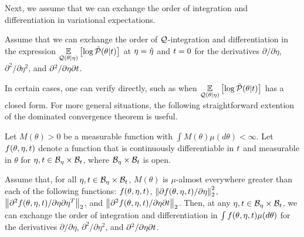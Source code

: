 Next, we assume that we can exchange the order of integration and
differentiation in variational expectations.

%
\begin{assu}
%
Assume that we can exchange the order of $\mathcal{Q}$-integration and differentiation in
the expression $\underset{\mathcal{Q}(\theta \vert \eta)}{\mathbb{E}}\left[\log \tilde{\mathcal{P}}(\theta \vert t)\right]$ at
$\eta = \hat\eta$ and $t = 0$ for the derivatives $\partial / \partial \eta$,
$\partial^2 / \partial \eta^2$, and $\partial^2 / \partial \eta \partial t$.
%
\end{assu}

In certain cases, one can verify  directly, such as when
$\underset{\mathcal{Q}(\theta \vert \eta)}{\mathbb{E}}\left[\log \tilde{\mathcal{P}}(\theta \vert t)\right]$ has a closed form.
For more general situations, the following straightforward extention of the
dominated convergence theorem \citep[Theorem 16.8]{billingsley:1986:probability}
is useful.

%
\begin{lem}
%
Let $M(\theta) > 0$ be a measurable function with $\int M(\theta) \mu(d\theta) <
\infty$.  Let $f(\theta, \eta, t)$ denote a function that is continuously
differentiable in $t$ and measurable in $\theta$ for $\eta, t \in \mathcal{B}_\eta
\times \mathcal{B}_t$, where $\mathcal{B}_\eta \times \mathcal{B}_t$ is open.

Assume that, for all $\eta, t \in \mathcal{B}_\eta \times \mathcal{B}_t$, $M(\theta)$ is
$\mu$-almost everywhere greater than each of the following functions: $f(\theta,
\eta, t)$, $\left\Vert\partial f(\theta, \eta, t) / \partial \eta\right\Vert^2_2$,
$\left\Vert\partial^2 f(\theta, \eta, t) / \partial \eta \partial \eta^T\right\Vert_2$, and
$\left\Vert\partial^2 f(\theta, \eta, t) / \partial \eta \partial t\right\Vert_2$. Then, at
any $\eta, t \in \mathcal{B}_\eta \times \mathcal{B}_t$, we can exchange the order of
integration and differentiation in $\int f(\theta, \eta, t) \mu(d\theta)$ for
the derivatives $\partial / \partial \eta$, $\partial^2 / \partial \eta^2$, and
$\partial^2 / \partial \eta \partial t$.

%
\end{lem}

